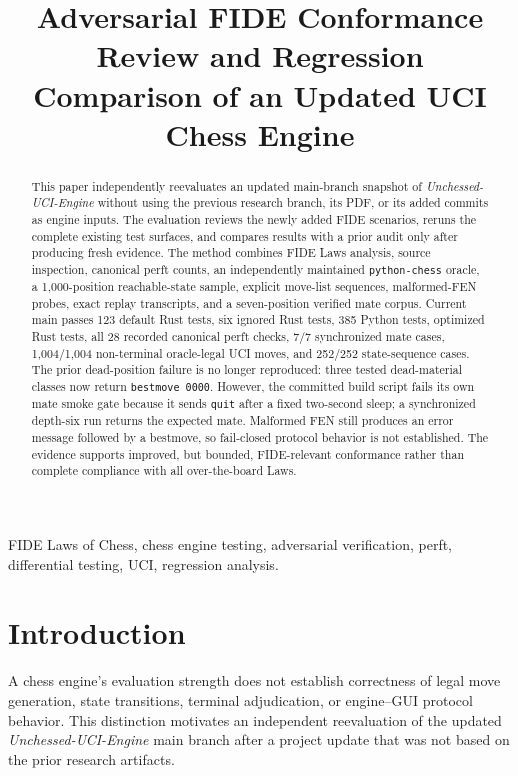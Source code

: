 \documentclass[conference]{IEEEtran}
\title{Adversarial FIDE Conformance Review and Regression Comparison of an Updated UCI Chess Engine}
\author{\IEEEauthorblockN{Manus AI}\IEEEauthorblockA{Independent Verification Report\\September 2026\\Updated main commit: \texttt{81a41818690afdf6f80b7ae3d822538dd795476f}}}
\begin{document}
\maketitle
\begin{abstract}
This paper independently reevaluates an updated main-branch snapshot of \textit{Unchessed-UCI-Engine} without using the previous research branch, its PDF, or its added commits as engine inputs. The evaluation reviews the newly added FIDE scenarios, reruns the complete existing test surfaces, and compares results with a prior audit only after producing fresh evidence. The method combines FIDE Laws analysis, source inspection, canonical perft counts, an independently maintained \texttt{python-chess} oracle, a 1,000-position reachable-state sample, explicit move-list sequences, malformed-FEN probes, exact replay transcripts, and a seven-position verified mate corpus. Current main passes 123 default Rust tests, six ignored Rust tests, 385 Python tests, optimized Rust tests, all 28 recorded canonical perft checks, 7/7 synchronized mate cases, 1,004/1,004 non-terminal oracle-legal UCI moves, and 252/252 state-sequence cases. The prior dead-position failure is no longer reproduced: three tested dead-material classes now return \texttt{bestmove 0000}. However, the committed build script fails its own mate smoke gate because it sends \texttt{quit} after a fixed two-second sleep; a synchronized depth-six run returns the expected mate. Malformed FEN still produces an error message followed by a bestmove, so fail-closed protocol behavior is not established. The evidence supports improved, but bounded, FIDE-relevant conformance rather than complete compliance with all over-the-board Laws.
\end{abstract}
\begin{IEEEkeywords}
FIDE Laws of Chess, chess engine testing, adversarial verification, perft, differential testing, UCI, regression analysis.
\end{IEEEkeywords}

\section{Introduction}
A chess engine's evaluation strength does not establish correctness of legal move generation, state transitions, terminal adjudication, or engine--GUI protocol behavior. This distinction motivates an independent reevaluation of the updated \textit{Unchessed-UCI-Engine} main branch after a project update that was not based on the prior research artifacts.
\end{document}
